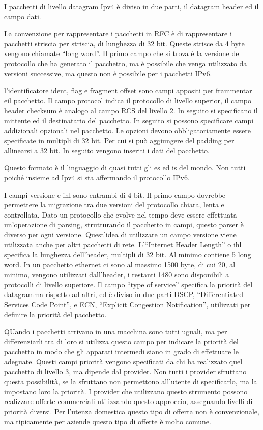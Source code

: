 \documentclass{article}
\numberwithin{equation}{subsection}
\begin{document}
I pacchetti di livello datagram Ipv4 è diviso in due parti, il datagram header ed il campo dati. 


La convenzione per rappresentare i pacchetti in RFC è di rappresentare i pacchetti striscia per striscia, di lunghezza di 32 bit. Queste strisce da 4 byte vengono 
chiamate ``long word''. 
Il primo campo che si trova è la versione del protocollo che ha generato il pacchetto, ma è possibile che venga utilizzato da versioni successive, ma questo non è possibile 
per i pacchetti IPv6. 

l'identificatore ident, flag e fragment offset sono campi appositi per frammentar eil pacchetto. Il campo protocol indica il protocollo di livello superior, il campo header checksum 
è analogo al campo RCS del livello 2. In seguito si specificano il mittente ed il destinatario del pacchetto. In seguito si possono specificare campi 
addizionali opzionali nel pacchetto. Le opzioni devono obbligatoriamente essere specificate in multipli di 32 bit. Per cui si può aggiungere del padding per allinearsi 
a 32 bit. 
In seguito vengono inseriti i dati del pacchetto. 

Questo formato è il linguaggio di quasi tutti gli es ed is del mondo. Non tutti poiché insieme ad Ipv4 si sta affermando il protocollo IPv6. 

I campi versione e ihl sono entrambi di 4 bit. Il primo campo dovrebbe permettere la migrazione tra due versioni del protocollo chiara, lenta e controllata. Dato un 
protocollo che evolve nel tempo deve essere effettuata un'operazione di parsing, strutturando il pacchetto in campi, questo parser è diverso per ogni versione. Quest'idea 
di utilizzare un campo versione viene utilizzata anche per altri pacchetti di rete. L'``Internet Header Length'' o ihl specifica la lunghezza dell'header, multipli di 
32 bit. Al minimo contiene 5 long word. In un pacchetto ethernet ci sono al massimo 1500 byte, di cui 20, al minimo, vengono utilizzati dall'header, i restanti 1480 
sono disponibili a protocolli di livello superiore. 
Il campo ``type of service'' specifica la priorità del datagramma rispetto ad altri, ed è diviso in due parti DSCP, ``Differentiated Services Code Point'', e 
ECN, ``Explicit Congestion Notification'', utilizzati per definire la priorità del pacchetto. 

QUando i pacchetti arrivano in una macchina sono tutti uguali, ma per differenziarli tra di loro si utilizza questo campo per indicare la priorità del pacchetto in 
modo che gli apparati intermedi siano in grado di effettuare le adeguate. Questi campi priorità vengono specificati da chi ha realizzato quel pacchetto di livello 3, 
ma dipende dal provider. Non tutti i provider sfruttano questa possibilità, se la sfruttano non permettono all'utente di specificarlo, ma la impostano loro la priorità.
I provider che utilizzano questo strumento possono realizzare offerte commerciali utilizzando questo approccio, assegnando livelli di priorità diversi. Per l'utenza 
domestica questo tipo di offerta non è convenzionale, ma tipicamente per aziende questo tipo di offerte è molto comune. 
\end{document}
